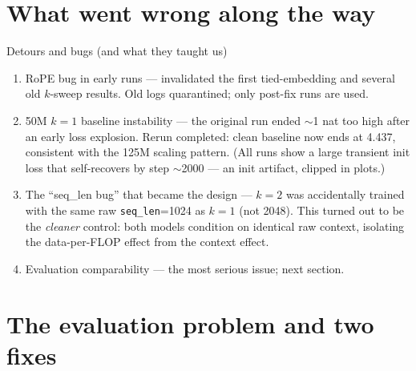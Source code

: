 \documentclass[10pt,aspectratio=169]{beamer}
\newcommand{\good}[1]{\textcolor{okgreen}{#1}}
\newcommand{\bad}[1]{\textcolor{warnred}{#1}}
\newcommand{\acc}[1]{\textcolor{accent}{#1}}
\begin{document}
\section{What went wrong along the way}

\begin{frame}{Detours and bugs (and what they taught us)}
  \begin{enumerate}
    \item \bad{RoPE bug} in early runs --- invalidated the first tied-embedding
          and several old $k$-sweep results. Old logs quarantined; only
          post-fix runs are used.
    \item \bad{50M $k{=}1$ baseline instability} --- the original run ended
          $\sim$1 nat too high after an early loss explosion.
          \good{Rerun completed:} clean baseline now ends at 4.437, consistent
          with the 125M scaling pattern. (All runs show a large transient init
          loss that self-recovers by step $\sim$2000 --- an init artifact,
          clipped in plots.)
    \item \acc{The ``seq\_len bug'' that became the design} --- $k{=}2$ was
          accidentally trained with the same raw \texttt{seq\_len}=1024 as
          $k{=}1$ (not 2048). This turned out to be the \emph{cleaner} control:
          both models condition on identical raw context, isolating the
          data-per-FLOP effect from the context effect.
    \item \bad{Evaluation comparability} --- the most serious issue; next
          section.
  \end{enumerate}
\end{frame}

\section{The evaluation problem and two fixes}
\end{document}
